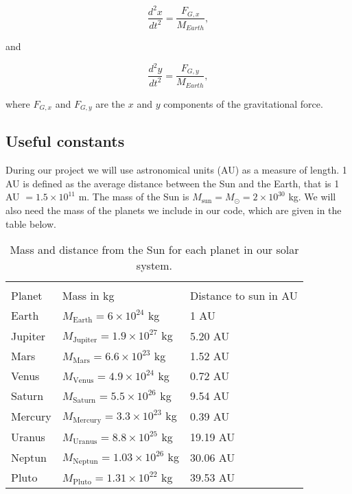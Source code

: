 \documentclass[a4paper, fontsize=11pt]{article}
\begin{document}
\begin{equation}
\dfrac{d^2x}{dt^2}=\dfrac{F_{G,x}}{M_{Earth}},
\end{equation}

and 

\begin{equation}
\dfrac{d^2y}{dt^2}=\dfrac{F_{G,y}}{M_{Earth}},
\end{equation}

where $F_{G,x}$ and $F_{G,y}$ are the $x$ and $y$ components of the gravitational force.


\subsection{Useful constants}
During our project we will use astronomical units (AU) as a measure of length. 1 AU is defined as the average distance between the Sun and the Earth, that is 1 AU $= 1.5 \times 10^{11}$ m. The mass of the Sun is $M_{\text{sun}}=M_{\odot}=2 \times 10^{30}$ kg. We will also need the mass of the planets we include in our code, which are given in the table below.

\begin{table}[H]
\begin{center}
\begin{tabular}{@{}lll@{}}
\toprule
\multicolumn{3}{c}{}               \\ \cmidrule(l){1-3} 
Planet & Mass in kg & Distance to sun in AU \\ \midrule
Earth    &    $M_{\text{Earth}}=6 \times 10^{24} $ kg &    1 AU\\
Jupiter    &    $M_{\text{Jupiter}}=1.9 \times 10^{27} $ kg &    5.20 AU\\
Mars    &    $M_{\text{Mars}}=6.6 \times 10^{23} $ kg &    1.52 AU\\
Venus    &    $M_{\text{Venus}}=4.9 \times 10^{24} $ kg &    0.72 AU\\
Saturn    &    $M_{\text{Saturn}}=5.5 \times 10^{26} $ kg &    9.54 AU\\
Mercury    &    $M_{\text{Mercury}}=3.3 \times 10^{23} $ kg &    0.39 AU\\
Uranus    &    $M_{\text{Uranus}}=8.8 \times 10^{25} $ kg &    19.19 AU\\
Neptun    &    $M_{\text{Neptun}}=1.03 \times 10^{26} $ kg &    30.06 AU\\
Pluto    &    $M_{\text{Pluto}}=1.31 \times 10^{22} $ kg &    39.53 AU\\
\bottomrule
\end{tabular}
\caption{Mass and distance from the Sun for each planet in our solar system.}
\end{center}
\end{table}
\end{document}
